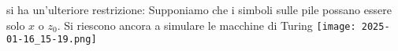 
	si ha un'ulteriore restrizione:
	Supponiamo che i simboli sulle pile possano essere solo $x$ o
$z_0$. Si riescono ancora a simulare le macchine di Turing
			\texttt{[image: 2025-01-16\_15-19.png]}


